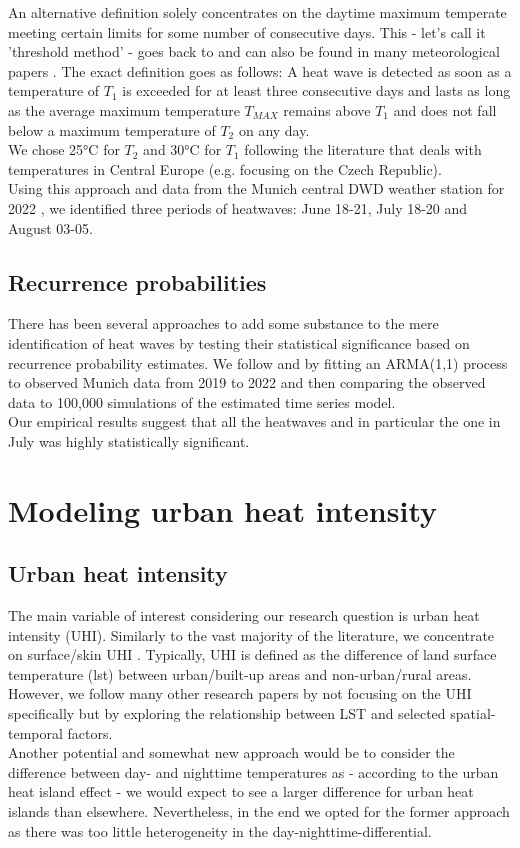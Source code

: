 \documentclass[12pt]{article}
\begin{document}
An alternative definition solely concentrates on the daytime maximum temperate meeting certain limits for some number of consecutive days. This - let's call it 'threshold method' - goes back to \citet{huth2000} and can also be found in many meteorological papers \citep{meehl2004,kysely2004,kysely2010}. The exact definition goes as follows: A heat wave is detected as soon as a temperature of $T_1$ is exceeded for at least three consecutive days and lasts as long as the average maximum temperature $T_{MAX}$ remains above $T_1$ and does not fall below a maximum temperature of $T_2$ on any day. \\
We chose 25°C for $T_2$ and 30°C for $T_1$ following the literature that deals with temperatures in Central Europe (e.g. \citet{kysely2004} focusing on the Czech Republic). \\
Using this approach and data from the Munich central DWD weather station for 2022 , we identified three periods of heatwaves: June 18-21, July 18-20 and August 03-05.

\subsection{Recurrence probabilities}

There has been several approaches to add some substance to the mere identification of heat waves by testing their statistical significance based on recurrence probability estimates. We follow \citet{mearns1984} and \citet{kysely2010} by fitting an ARMA(1,1) process to observed Munich data from 2019 to 2022 and then comparing the observed data to 100,000 simulations of the estimated time series model. \\
Our empirical results suggest that all the heatwaves and in particular the one in July was highly statistically significant.


\section{Modeling urban heat intensity}

\subsection{Urban heat intensity}

The main variable of interest considering our research question is urban heat intensity (UHI). Similarly to the vast majority of the literature, we concentrate on surface/skin UHI \citep{deilami2018}. Typically, UHI is defined as the difference of land surface temperature (\acrshort{lst}) between urban/built-up areas and non-urban/rural areas. However, we follow many other research papers by not focusing on the UHI specifically but by exploring the relationship between LST and selected spatial-temporal factors.\\
Another potential and somewhat new approach would be to consider the difference between day- and nighttime temperatures as - according to the urban heat island effect - we would expect to see a larger difference for urban heat islands than elsewhere. Nevertheless, in the end we opted for the former approach as there was too little heterogeneity in the day-nighttime-differential.
\end{document}
